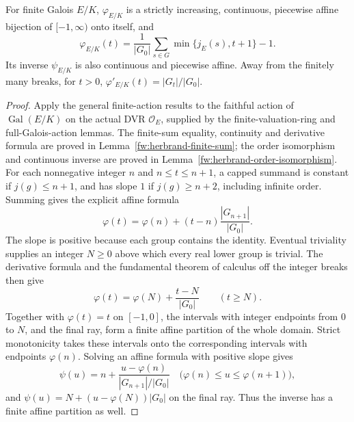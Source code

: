 \begin{lemma}
\label{fw:herbrand-functions}
\leanok
For finite Galois $E/K$, $\varphi_{E/K}$ is a strictly increasing,
continuous, piecewise affine bijection of $[-1,\infty)$ onto itself,
and
\[
 \varphi_{E/K}(t)=\frac1{|G_0|}
      \sum_{s\in G}\min\{j_E(s),t+1\}-1.                 \tag{1}
\]
Its inverse $\psi_{E/K}$ is also continuous and piecewise affine.
Away from the finitely many breaks, for $t>0$,
$\varphi'_{E/K}(t)=|G_t|/|G_0|$.
\end{lemma}
\begin{proof}
Apply the general finite-action results to the faithful action of
$\operatorname{Gal}(E/K)$ on the actual DVR $\mathcal O_E$, supplied by
the finite-valuation-ring and full-Galois-action lemmas.
The finite-sum equality, continuity and derivative formula are proved in
Lemma~\ref{fw:herbrand-finite-sum}; the order isomorphism and continuous inverse
are proved in Lemma~\ref{fw:herbrand-order-isomorphism}.
For each nonnegative integer $n$ and $n\leq t\leq n+1$, a capped summand
is constant if $j(g)\leq n+1$, and has slope $1$ if $j(g)\geq n+2$,
including infinite order. Summing gives the explicit affine formula
\[
 \varphi(t)=\varphi(n)+(t-n)\frac{|G_{n+1}|}{|G_0|}.
\]
The slope is positive because each group contains the identity.
Eventual triviality supplies an integer $N\geq0$ above which every real
lower group is trivial. The derivative formula and the fundamental theorem
of calculus off the integer breaks then give
\[
 \varphi(t)=\varphi(N)+\frac{t-N}{|G_0|}\qquad(t\geq N).
\]
Together with $\varphi(t)=t$ on $[-1,0]$, the intervals with integer
endpoints from $0$ to $N$, and the final ray, form a finite affine
partition of the whole domain. Strict monotonicity takes these intervals
onto the corresponding intervals with endpoints $\varphi(n)$. Solving
an affine formula with positive slope gives
\[
 \psi(u)=n+\frac{u-\varphi(n)}{|G_{n+1}|/|G_0|}
 \quad\bigl(\varphi(n)\leq u\leq\varphi(n+1)\bigr),
\]
and $\psi(u)=N+(u-\varphi(N))|G_0|$ on the final ray.
Thus the inverse has a finite affine partition as well.
\end{proof}


